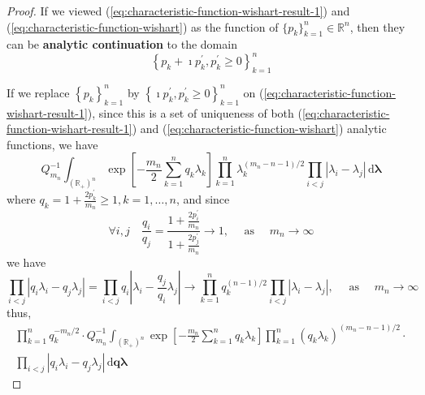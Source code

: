 \begin{proof}
    If we viewed (\ref{eq:characteristic-function-wishart-result-1}) and (\ref{eq:characteristic-function-wishart}) as the function of $\{p_{k}\}_{k=1}^{n}\in\mathbb{R}^{n}$, then they can be \textbf{analytic continuation} to the domain
    \begin{equation*}
        \left\{p_{k}+\imath p_{k}^{\prime},p_{k}^{\prime}\geq 0\right\}_{k=1}^{n}
    \end{equation*}

    If we replace $\left\{p_{k}\right\}_{k=1}^{n}$ by $\left\{\imath p_{k}^{\prime},p_{k}^{\prime}\geq 0\right\}_{k=1}^{n}$ on (\ref{eq:characteristic-function-wishart-result-1}), since this is a set of uniqueness of both (\ref{eq:characteristic-function-wishart-result-1}) and (\ref{eq:characteristic-function-wishart}) analytic functions, we have
    \begin{equation*}
        Q_{m_{n}}^{-1}\int_{\left(\mathbb{R}_{+}\right)^{n}}\exp\left[-\frac{m_{n}}{2}\sum_{k=1}^{n}q_{k}\lambda_{k}\right]\prod_{k=1}^{n}\lambda_{k}^{(m_{n}-n-1)/2}\prod_{i<j}\left|\lambda_{i}-\lambda_{j}\right|\,\mathrm{d}\boldsymbol{\lambda}
    \end{equation*}
    where $q_{k}=1+\frac{2p_{k}^{\prime}}{m_{n}}\geq 1,k=1,\ldots,n$, and since
    \begin{equation*}
        \forall i,j\quad\frac{q_{i}}{q_{j}}=\frac{1+\frac{2p_{i}^{\prime}}{m_{n}}}{1+\frac{2p_{j}^{\prime}}{m_{n}}}\rightarrow 1,\quad\text{ as }\quad m_{n}\rightarrow\infty
    \end{equation*}
    we have
    \begin{equation*}
        \prod_{i<j}\left|q_{i}\lambda_{i}-q_{j}\lambda_{j}\right|=\prod_{i<j}q_{i}\left|\lambda_{i}-\frac{q_{j}}{q_{i}}\lambda_{j}\right|\rightarrow\prod_{k=1}^{n}q_{k}^{(n-1)/2}\prod_{i<j}\left|\lambda_{i}-\lambda_{j}\right|,\quad\text{ as }\quad m_{n}\rightarrow\infty
    \end{equation*}
    thus,
    \begin{equation*}
        \begin{array}{c}
            \prod_{k=1}^{n}q_{k}^{-m_{n}/2}\cdot Q_{m_{n}}^{-1}\int_{\left(\mathbb{R}_{+}\right)^{n}}\exp\left[-\frac{m_{n}}{2}\sum_{k=1}^{n}q_{k}\lambda_{k}\right]\prod_{k=1}^{n}\left(q_{k}\lambda_{k}\right)^{(m_{n}-n-1)/2}\cdot \\
            \prod_{i<j}\left|q_{i}\lambda_{i}-q_{j}\lambda_{j}\right|\,\mathrm{d}\mathbf{q}\boldsymbol{\lambda}
        \end{array}
    \end{equation*}

\end{proof}
